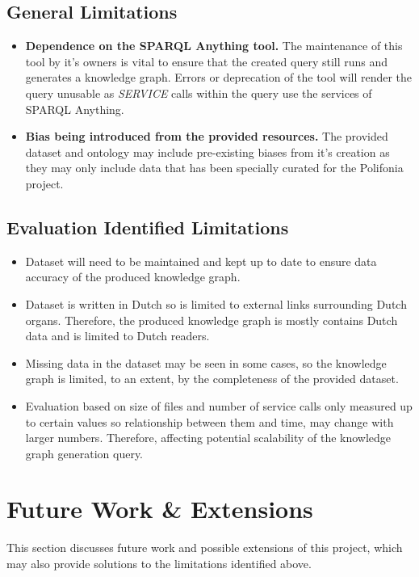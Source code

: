 \subsection{General Limitations}
\begin{itemize}
    \item \textbf{Dependence on the SPARQL Anything tool.} The maintenance of this tool by it's owners is vital to ensure that the created query still runs and generates a knowledge graph. Errors or deprecation of the tool will render the query unusable as \textit{SERVICE} calls within the query use the services of SPARQL Anything. 
    \item \textbf{Bias being introduced from the provided resources.} The provided dataset and ontology may include pre-existing biases from it's creation as they may only include data that has been specially curated for the Polifonia project. 
\end{itemize}

\subsection{Evaluation Identified Limitations}
\begin{itemize}
    \item Dataset will need to be maintained and kept up to date to ensure data accuracy of the produced knowledge graph. 
    \item Dataset is written in Dutch so is limited to external links surrounding Dutch organs. Therefore, the produced knowledge graph is mostly contains Dutch data and is limited to Dutch readers.  
    \item Missing data in the dataset may be seen in some cases, so the knowledge graph is limited, to an extent, by the completeness of the provided dataset.
    \item  Evaluation based on size of files and number of service calls only measured up to certain values so relationship between them and time, may change with larger numbers. Therefore, affecting potential scalability of the knowledge graph generation query. 
\end{itemize}

\section{Future Work \& Extensions}
This section discusses future work and possible extensions of this project, which may also provide solutions to the limitations identified above.


